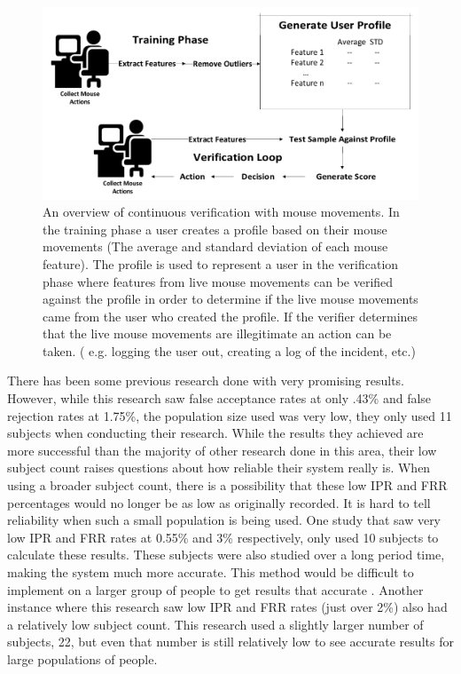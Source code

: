 \documentclass[conference]{IEEEtran}
\begin{document}
\begin{figure}[t!]
  \includegraphics[width=1\linewidth]{Overview.pdf}
\caption{An overview of continuous verification with mouse movements. In the training phase a user creates a profile based on their mouse movements (The average and standard deviation of each mouse feature). The profile is used to represent a user in the verification phase where features from live mouse movements can be verified against the profile in order to determine if the live mouse movements came from the user who created the profile. If the verifier determines that the live mouse movements are illegitimate an action can be taken. ( e.g. logging the user out, creating a log of the incident, etc.)}
\end{figure}


There has been some previous research done with very promising results. However, while this research saw false acceptance rates at only .43\% and false rejection rates at 1.75\%, the population size used was very low, they only used 11 subjects when conducting their research. While the results they achieved are more successful than the majority of other research done in this area, their low subject count raises questions about how reliable their system really is. When using a broader subject count, there is a possibility that these low IPR and FRR percentages would no longer be as low as originally recorded. It is hard to tell reliability when such a small population is being used. \cite{Pus} One study that saw very low IPR and FRR rates at 0.55\% and 3\% respectively, only used 10 subjects to calculate these results. These subjects were also studied over a long period time, making the system much more accurate. This method would be difficult to implement on a larger group of people to get results that accurate \cite{She}. Another instance where this research saw low IPR and FRR rates (just over 2\%) also had a relatively low subject count. This research used a slightly larger number of subjects, 22, but even that number is still relatively low to see accurate results for large populations of people. \cite{Ahmed}
\end{document}

